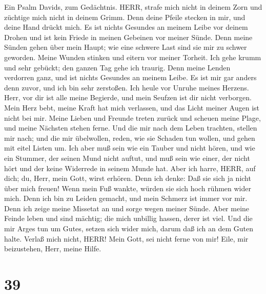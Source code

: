  Ein Psalm Davids, zum Gedächtnis. HERR, strafe mich nicht
in deinem Zorn und züchtige mich nicht in deinem Grimm. 
Denn deine Pfeile stecken in mir, und deine Hand drückt mich.
 Es ist nichts Gesundes an meinem Leibe vor deinem Drohen
und ist kein Friede in meinen Gebeinen vor meiner Sünde. 
Denn meine Sünden gehen über mein Haupt; wie eine schwere Last sind sie
mir zu schwer geworden.  Meine Wunden stinken und eitern vor
meiner Torheit.  Ich gehe krumm und sehr gebückt; den ganzen
Tag gehe ich traurig.  Denn meine Lenden verdorren ganz, und
ist nichts Gesundes an meinem Leibe.  Es ist mir gar anders
denn zuvor, und ich bin sehr zerstoßen. Ich heule vor Unruhe meines
Herzens.  Herr, vor dir ist alle meine Begierde, und mein
Seufzen ist dir nicht verborgen.  Mein Herz bebt, meine
Kraft hat mich verlassen, und das Licht meiner Augen ist nicht bei mir.
 Meine Lieben und Freunde treten zurück und scheuen meine
Plage, und meine Nächsten stehen ferne.  Und die mir nach
dem Leben trachten, stellen mir nach; und die mir übelwollen, reden, wie
sie Schaden tun wollen, und gehen mit eitel Listen um.  Ich
aber muß sein wie ein Tauber und nicht hören, und wie ein Stummer, der
seinen Mund nicht auftut,  und muß sein wie einer, der
nicht hört und der keine Widerrede in seinem Munde hat. 
Aber ich harre, HERR, auf dich; du, Herr, mein Gott, wirst erhören.
 Denn ich denke: Daß sie sich ja nicht über mich freuen!
Wenn mein Fuß wankte, würden sie sich hoch rühmen wider mich.
 Denn ich bin zu Leiden gemacht, und mein Schmerz ist immer
vor mir.  Denn ich zeige meine Missetat an und sorge wegen
meiner Sünde.  Aber meine Feinde leben und sind mächtig;
die mich unbillig hassen, derer ist viel.  Und die mir
Arges tun um Gutes, setzen sich wider mich, darum daß ich an dem Guten
halte.  Verlaß mich nicht, HERR! Mein Gott, sei nicht ferne
von mir!  Eile, mir beizustehen, Herr, meine Hilfe.

\hypertarget{section-38}{%
\section{39}\label{section-38}}

